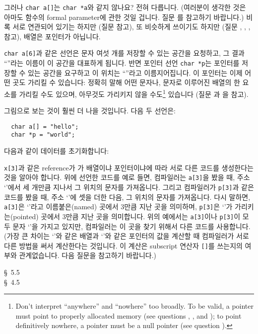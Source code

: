 \begin{faq}
	그러나 \verb+char a[]+는 \verb+char *a+와 같지 않나요?
\A
	전혀 다릅니다.  (여러분이 생각한 것은 아마도 함수의 formal
	parameter에 관한 것일 겁니다.  질문 를 참고하기 바랍니다.)
	비록 서로 연관되어 있기는 하지만 (질문  참고), 또 비슷하게
	쓰이기도 하지만 (질문 , , ,  참고),
        배열은 포인터가 아닙니다.  

	\verb+char a[6]+과 같은 선언은 문자
	여섯 개를 저장할 수 있는 공간을 요청하고, 그 결과 ``''라는
	이름이 이 공간을 대표하게 됩니다.
	반면 포인터 선언 \verb+char *p+는 포인터를 저장할 수 있는 공간을
	요구하고 이 위치는 ``''라고 이름지어집니다.
	이 포인터는 이제 어떤 곳도 가리킬 수 있습니다: 정확히 말해 어떤
	문자나, 문자로 이루어진	배열의 한 요소를 가리킬 수도 있으며,
	아무것도 가리키지 않을 수도\footnote{Don't interpret ``anywhere''
	   and ``nowhere'' too broadly. To be valid, a pointer must point to
	   properly allocated memory (see questions , , and
           ); to
	   point definitively nowhere, a pointer must be a null pointer
	   (see question ).} 
	있습니다 (질문 과 을 참고).

	그림으로 보는 것이 훨씬 더 나을 것입니다.  다음 두 선언은:

\begin{verbatim}
  char a[] = "hello";
  char *p = "world";
\end{verbatim}
	\noindent 다음과 같이 데이터를 초기화합니다:



	\noindent \verb+x[3]+과 같은 reference가 가 배열이냐
        포인터이냐에
	따라 서로 다른 코드를 생성한다는 것을 알아야 합니다.
	위에 선언한 코드를 예로 들면, 컴파일러는 \verb+a[3]+을 봤을 때,
	주소 `'에서 세 개만큼 지나서 그 위치의 문자를 가져옵니다.
	그리고 컴파일러가 \verb+p[3]+과 같은 코드를 봤을 때, 주소 `'에
	셋을 더한 다음, 그 위치의 문자를 가져옵니다.
	다시 말하면, \verb+a[3]+은 `'라고 이름붙은(named) 곳에서 3만큼
	지난 곳을 의미하며, \verb+p[3]+은 `'가 가리키는(pointed) 곳에서
	3만큼 지난 곳을	의미합니다.
	위의 예에서는 \verb+a[3]+이나 \verb+p[3]+이
	모두 문자 `'을 가지고 있지만, 컴파일러는 이 곳을 찾기 위해서
	다른 코드를 사용합니다.  (가장 큰 차이는 `'와 같은 배열과
	`'와 같은 포인터의 값을 계산할 때 컴파일러가 서로 다른 방법을
	써서 계산한다는 것입니다.  이 계산은 subscript 연산자 \verb+[]+를
	쓰는지의 여부와 관계없습니다.  다음 질문을 참고하기 바랍니다.)

\R
	\cite{kr2} \S\ 5.5  \\
	\cite{ctp} \S\ 4.5 
\end{faq}

